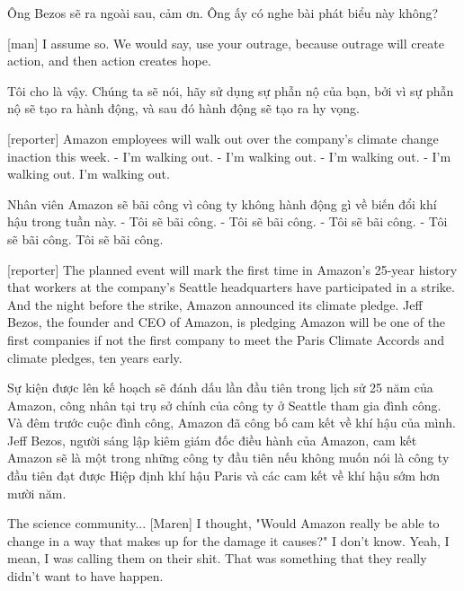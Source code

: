 \documentclass[a4paper]{article}
\begin{document}
	\begin{vietnamese-v2}
		[man] Ông Bezos sẽ ra ngoài sau, cảm ơn.
		Ông ấy có nghe bài phát biểu này không?
	\end{vietnamese-v2}
	
	[man] I assume so.
	We would say, use your outrage, because outrage will create action, and then action creates hope.
	
	\begin{vietnamese-v2}
		 Tôi cho là vậy.
		Chúng ta sẽ nói, hãy sử dụng sự phẫn nộ của bạn, bởi vì sự phẫn nộ sẽ tạo ra hành động, và sau đó hành động sẽ tạo ra hy vọng.
	\end{vietnamese-v2}
	
	[reporter] Amazon employees will walk out over the company's climate change inaction this week.
	- I'm walking out. - I'm walking out.
	- I'm walking out. - I'm walking out.
	I'm walking out.
	
	\begin{vietnamese-v2}
		 Nhân viên Amazon sẽ bãi công vì công ty không hành động gì về biến đổi khí hậu trong tuần này.
		- Tôi sẽ bãi công. - Tôi sẽ bãi công.
		- Tôi sẽ bãi công. - Tôi sẽ bãi công.
		Tôi sẽ bãi công.
	\end{vietnamese-v2}
	
	[reporter] The planned event will mark the first time in Amazon's 25-year history that workers at the company's Seattle headquarters have participated in a strike.
	And the night before the strike, Amazon announced its climate pledge.
	Jeff Bezos, the founder and CEO of Amazon, is pledging Amazon will be one of the first companies if not the first company to meet the Paris Climate Accords and climate pledges, ten years early.
	
	\begin{vietnamese-v2}
		 Sự kiện được lên kế hoạch sẽ đánh dấu lần đầu tiên trong lịch sử 25 năm của Amazon, công nhân tại trụ sở chính của công ty ở Seattle tham gia đình công.
		Và đêm trước cuộc đình công, Amazon đã công bố cam kết về khí hậu của mình.
		Jeff Bezos, người sáng lập kiêm giám đốc điều hành của Amazon, cam kết Amazon sẽ là một trong những công ty đầu tiên nếu không muốn nói là công ty đầu tiên đạt được Hiệp định khí hậu Paris và các cam kết về khí hậu sớm hơn mười năm.
	\end{vietnamese-v2}
	
	The science community...
	[Maren] I thought, "Would Amazon really be able to change in a way that makes up for the damage it causes?"
	I don't know.
	Yeah, I mean, I was calling them on their shit.
	That was something that they really didn't want to have happen.
	
\end{document}
